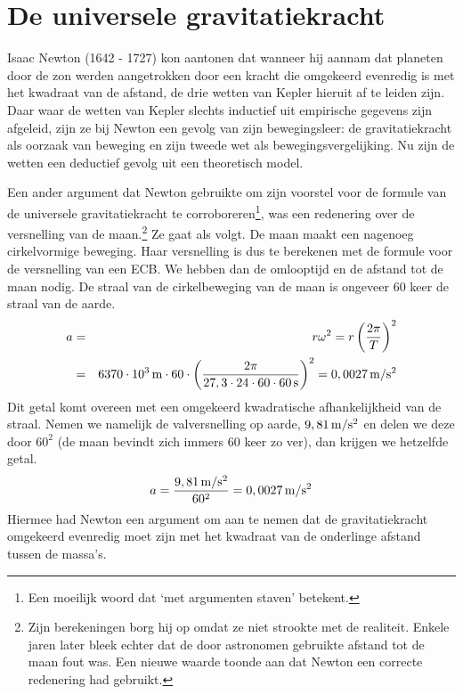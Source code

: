 \documentclass{ximera}
\begin{document}
	\author{Bart Lambregs}




	\section{De universele gravitatiekracht}

	
	
	Isaac Newton (1642 - 1727) kon aantonen dat wanneer hij aannam dat planeten door de zon werden aangetrokken door een kracht die omgekeerd evenredig is met het kwadraat van de afstand, de drie wetten van Kepler hieruit af te leiden zijn. Daar waar de wetten van Kepler slechts inductief uit empirische gegevens zijn afgeleid, zijn ze bij Newton een gevolg van zijn bewegingsleer: de gravitatiekracht als oorzaak van beweging en zijn tweede wet als bewegingsvergelijking. Nu zijn de wetten een deductief gevolg uit een theoretisch model.
	
	Een ander argument dat Newton gebruikte om zijn voorstel voor de formule van de universele gravitatiekracht te corroboreren\footnote{Een moeilijk woord dat `met argumenten staven' betekent.}, was een redenering over de versnelling van de maan.\footnote{Zijn berekeningen borg hij op omdat ze niet strookte met de realiteit. Enkele jaren later bleek echter dat de door astronomen gebruikte afstand tot de maan fout was. Een nieuwe waarde toonde aan dat Newton een correcte redenering had gebruikt.} Ze gaat als volgt. De maan maakt een nagenoeg cirkelvormige beweging. Haar versnelling is dus te berekenen met de formule voor de versnelling van een ECB. We hebben dan de omlooptijd en de afstand tot de maan nodig. De straal van de cirkelbeweging van de maan is ongeveer 60 keer de straal van de aarde.
	\begin{eqnarray*}
		a&=&r\omega^2=r\left(\frac{2\pi}{T}\right)^2\\
		&=&6370\cdot10^3\rm\,m\cdot60\cdot\left(\frac{2\pi}{27,3\cdot24\cdot60\cdot60\rm\,s}\right)^2=0,0027\rm\,m/s^2
	\end{eqnarray*}
	Dit getal komt overeen met een omgekeerd kwadratische afhankelijkheid van de straal. Nemen we namelijk de valversnelling op aarde, $9,81\rm\,m/s^2$ en delen we deze door $60^2$ (de maan bevindt zich immers 60 keer zo ver), dan krijgen we hetzelfde getal.
	\begin{eqnarray*}
		a=\frac{9,81\rm\,m/s^2}{60^2}=0,0027\rm\,m/s^2
	\end{eqnarray*}
	Hiermee had Newton een argument om aan te nemen dat de gravitatiekracht omgekeerd evenredig moet zijn met het kwadraat van de onderlinge afstand tussen de massa's.
	
\end{document}
